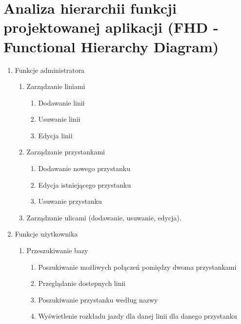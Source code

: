 \section{Analiza hierarchii funkcji projektowanej aplikacji (FHD - Functional Hierarchy
Diagram)}
\renewcommand{\labelenumii}{\arabic{enumi}.\arabic{enumii}.}
\renewcommand{\labelenumiii}{\arabic{enumi}.\arabic{enumii}.\arabic{enumiii}.}

\begin{enumerate}
    \item Funkcje administratora
    \begin{enumerate}
        \item Zarządzanie liniami
                \begin{enumerate}
                    \item Dodawanie linii
                    \item Usuwanie linii
                    \item Edycja linii
                \end{enumerate}
        \item Zarządzanie przystankami
                \begin{enumerate}
                    \item Dodawanie nowego przystanku
                    \item Edycja istniejącego przystanku
                    \item Usuwanie przystanku
                \end{enumerate}
        \item Zarządzanie ulicami (dodawanie, usuwanie, edycja).
    \end{enumerate}

    \item Funkcje użytkownika
     \begin{enumerate}
        \item Przeszukiwanie bazy
            \begin{enumerate}
                \item Poszukiwanie możliwych połączeń pomiędzy dwoma przystankami
                \item Przeglądanie dostepnych linii
                \item Poszukiwanie przystanku według nazwy
                \item Wyświetlenie rozkładu jazdy dla danej linii dla danego przystanku
            \end{enumerate}

     \end{enumerate}

\end{enumerate}




